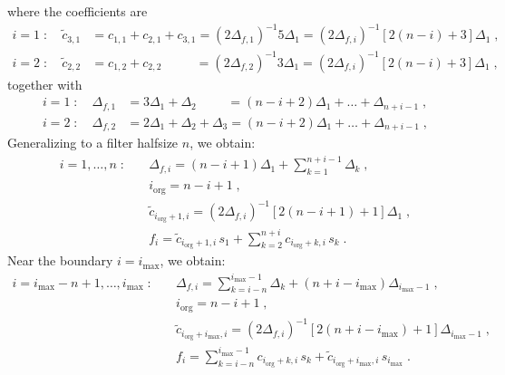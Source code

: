 where the coefficients are
\begin{subequations}
  \begin{align}
    i=1\;:\quad\tilde{c}_{3,1} &= c_{1,1}+c_{2,1}+c_{3,1} =(2\Delta_{f,1})^{-1}5\Delta_{1}
    =(2\Delta_{f,i})^{-1}[2(n-i)+3]\Delta_{1}\;,\\
    i=2\;:\quad\tilde{c}_{2,2} &= c_{1,2}+c_{2,2}\phantom{(+c_{3,1}} =(2\Delta_{f,2})^{-1}3\Delta_{1}
    =(2\Delta_{f,i})^{-1}[2(n-i)+3]\Delta_{1}\;,
  \end{align}
\end{subequations}
together with
\begin{subequations}
  \begin{align}
    i=1\;:\quad\Delta_{f,1}&=3\Delta_{1}+\Delta_{2}\phantom{+\Delta_{3})}=
    (n-i+2)\Delta_{1}+\ldots+\Delta_{n+i-1}\;,\\
    i=2\;:\quad\Delta_{f,2}&=2\Delta_{1}+\Delta_{2}+\Delta_{3}=
    (n-i+2)\Delta_{1}+\ldots+\Delta_{n+i-1}\;,
  \end{align}
\end{subequations}
Generalizing to a filter halfsize $n$, we obtain:
\begin{subequations}
  \begin{align}
    i=1,\ldots,n\;:\quad
    & \Delta_{f,i} = (n-i+1)\Delta_{1}+\sum_{k=1}^{n+i-1}\Delta_{k} \;,\\
    & i_\mathrm{org}=n-i+1\;,\\
    &\tilde{c}_{i_\mathrm{org}+1,i} = (2\Delta_{f,i})^{-1}[2(n-i+1)+1]\Delta_{1}\;,\\
    &f_{i} =\tilde{c}_{i_\mathrm{org}+1,i}\,s_1+\sum_{k=2}^{n+i} c_{i_\mathrm{org}+k,i}\,s_{k} \;.
  \end{align}
\end{subequations}
Near the boundary $i=i_\mathrm{max}$, we obtain:
\begin{subequations}
  \begin{align}
    i=i_\mathrm{max}-n+1,\ldots,i_\mathrm{max}\;:\quad
    & \Delta_{f,i} = \sum_{k=i-n}^{i_\mathrm{max}-1}\Delta_{k} +(n+i-i_\mathrm{max})\Delta_{i_\mathrm{max}-1}\;,\\
    & i_\mathrm{org}=n-i+1\;,\\
    &\tilde{c}_{i_\mathrm{org}+i_\mathrm{max},i} = (2\Delta_{f,i})^{-1}[2(n+i-i_\mathrm{max})+1]\Delta_{i_\mathrm{max}-1}\;,\\
    &f_{i} =\sum_{k=i-n}^{i_\mathrm{max}-1} c_{i_\mathrm{org}+k,i}\,s_{k}+\tilde{c}_{i_\mathrm{org}+i_\mathrm{max},i}\,s_{i_\mathrm{max}} \;.
  \end{align}
\end{subequations}

